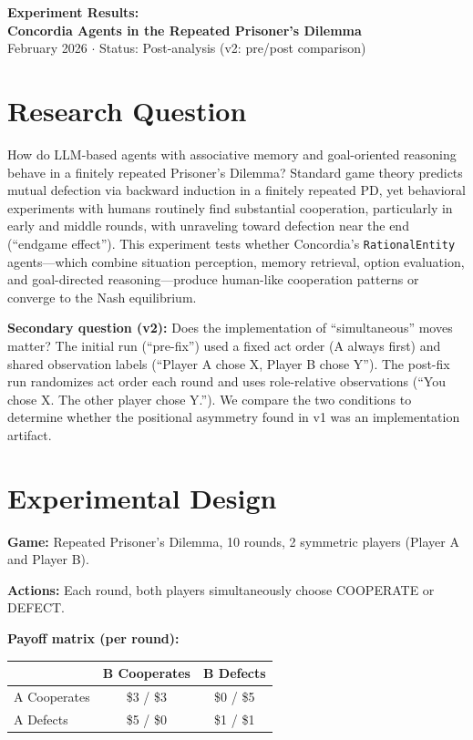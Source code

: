 \documentclass[11pt]{article}
\begin{document}
\begin{center}
{\Large \textbf{Experiment Results:\\Concordia Agents in the Repeated Prisoner's Dilemma}}\\[0.5em]
{\large February 2026 \quad $\cdot$ \quad Status: Post-analysis (v2: pre/post comparison)}
\end{center}

\section*{Research Question}

How do LLM-based agents with associative memory and goal-oriented reasoning behave in a finitely repeated Prisoner's Dilemma? Standard game theory predicts mutual defection via backward induction in a finitely repeated PD, yet behavioral experiments with humans routinely find substantial cooperation, particularly in early and middle rounds, with unraveling toward defection near the end (``endgame effect''). This experiment tests whether Concordia's \texttt{RationalEntity} agents---which combine situation perception, memory retrieval, option evaluation, and goal-directed reasoning---produce human-like cooperation patterns or converge to the Nash equilibrium.

\textbf{Secondary question (v2):} Does the implementation of ``simultaneous'' moves matter? The initial run (``pre-fix'') used a fixed act order (A always first) and shared observation labels (``Player A chose X, Player B chose Y''). The post-fix run randomizes act order each round and uses role-relative observations (``You chose X. The other player chose Y.''). We compare the two conditions to determine whether the positional asymmetry found in v1 was an implementation artifact.

\section*{Experimental Design}

\textbf{Game:} Repeated Prisoner's Dilemma, 10 rounds, 2 symmetric players (Player A and Player B).

\textbf{Actions:} Each round, both players simultaneously choose COOPERATE or DEFECT.

\textbf{Payoff matrix (per round):}

\begin{center}
\begin{tabular}{lcc}
\toprule
 & B Cooperates & B Defects \\
\midrule
A Cooperates & \$3 / \$3 & \$0 / \$5 \\
A Defects & \$5 / \$0 & \$1 / \$1 \\
\bottomrule
\end{tabular}
\end{center}
\end{document}
